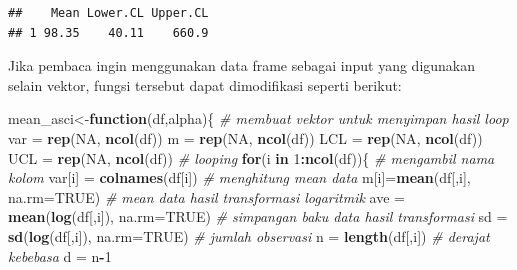 \documentclass[]{book}
\newenvironment{Shaded}{\begin{snugshade}}{\end{snugshade}}
\newcommand{\KeywordTok}[1]{\textcolor[rgb]{0.13,0.29,0.53}{\textbf{#1}}}
\newcommand{\DataTypeTok}[1]{\textcolor[rgb]{0.13,0.29,0.53}{#1}}
\newcommand{\DecValTok}[1]{\textcolor[rgb]{0.00,0.00,0.81}{#1}}
\newcommand{\FloatTok}[1]{\textcolor[rgb]{0.00,0.00,0.81}{#1}}
\newcommand{\StringTok}[1]{\textcolor[rgb]{0.31,0.60,0.02}{#1}}
\newcommand{\CommentTok}[1]{\textcolor[rgb]{0.56,0.35,0.01}{\textit{#1}}}
\newcommand{\OtherTok}[1]{\textcolor[rgb]{0.56,0.35,0.01}{#1}}
\newcommand{\ControlFlowTok}[1]{\textcolor[rgb]{0.13,0.29,0.53}{\textbf{#1}}}
\newcommand{\OperatorTok}[1]{\textcolor[rgb]{0.81,0.36,0.00}{\textbf{#1}}}
\newcommand{\NormalTok}[1]{#1}
\begin{document}
\begin{Shaded}
\end{Shaded}

\begin{verbatim}
##    Mean Lower.CL Upper.CL
## 1 98.35    40.11    660.9
\end{verbatim}

Jika pembaca ingin menggunakan data frame sebagai input yang digunakan
selain vektor, fungsi tersebut dapat dimodifikasi seperti berikut:

\begin{Shaded}
\begin{Highlighting}[]
\NormalTok{mean_asci<-}\ControlFlowTok{function}\NormalTok{(df,alpha)\{}
  \CommentTok{# membuat vektor untuk menyimpan hasil loop}
\NormalTok{  var =}\StringTok{ }\KeywordTok{rep}\NormalTok{(}\OtherTok{NA}\NormalTok{, }\KeywordTok{ncol}\NormalTok{(df))}
\NormalTok{  m =}\StringTok{ }\KeywordTok{rep}\NormalTok{(}\OtherTok{NA}\NormalTok{, }\KeywordTok{ncol}\NormalTok{(df))}
\NormalTok{  LCL =}\StringTok{ }\KeywordTok{rep}\NormalTok{(}\OtherTok{NA}\NormalTok{, }\KeywordTok{ncol}\NormalTok{(df))}
\NormalTok{  UCL =}\StringTok{ }\KeywordTok{rep}\NormalTok{(}\OtherTok{NA}\NormalTok{, }\KeywordTok{ncol}\NormalTok{(df))}
  \CommentTok{# looping}
  \ControlFlowTok{for}\NormalTok{(i }\ControlFlowTok{in} \DecValTok{1}\OperatorTok{:}\KeywordTok{ncol}\NormalTok{(df))\{}
    \CommentTok{# mengambil nama kolom}
\NormalTok{    var[i] =}\StringTok{ }\KeywordTok{colnames}\NormalTok{(df[i])}
    \CommentTok{# menghitung mean data}
\NormalTok{    m[i]=}\KeywordTok{mean}\NormalTok{(df[,i], }\DataTypeTok{na.rm=}\OtherTok{TRUE}\NormalTok{)}
    \CommentTok{# mean data hasil transformasi logaritmik}
\NormalTok{    ave =}\StringTok{ }\KeywordTok{mean}\NormalTok{(}\KeywordTok{log}\NormalTok{(df[,i]), }\DataTypeTok{na.rm=}\OtherTok{TRUE}\NormalTok{)}
    \CommentTok{# simpangan baku data hasil transformasi}
\NormalTok{    sd =}\StringTok{ }\KeywordTok{sd}\NormalTok{(}\KeywordTok{log}\NormalTok{(df[,i]), }\DataTypeTok{na.rm=}\OtherTok{TRUE}\NormalTok{)}
    \CommentTok{# jumlah observasi}
\NormalTok{    n =}\StringTok{ }\KeywordTok{length}\NormalTok{(df[,i])}
    \CommentTok{# derajat kebebasa}
\NormalTok{    d =}\StringTok{ }\NormalTok{n}\OperatorTok{-}\DecValTok{1}

\end{Highlighting}
\end{Shaded}
\end{document}
